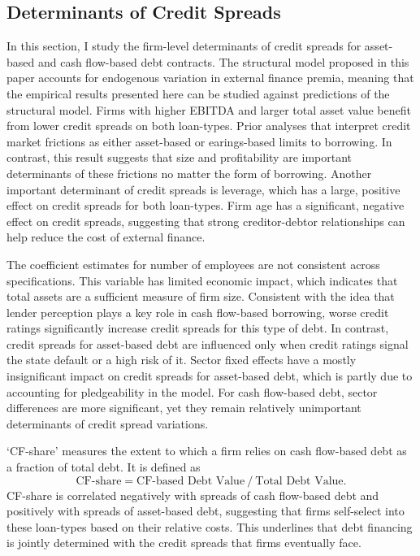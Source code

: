 \documentclass[12pt]{article}
\begin{document}
\subsection{Determinants of Credit Spreads \label{sec:credit spreads}} 
In this section, I study the firm-level determinants of credit spreads for asset-based and cash flow-based debt contracts. The structural model proposed in this paper accounts for endogenous variation in external finance premia, meaning that the empirical results presented here can be studied against predictions of the structural model. Firms with higher EBITDA and larger total asset value benefit from lower credit spreads on both loan-types. Prior analyses that interpret credit market frictions as either asset-based or earings-based limits to borrowing. In contrast, this result suggests that size and profitability are important determinants of these frictions no matter the form of borrowing. Another important determinant of credit spreads is leverage, which has a large, positive effect on credit spreads for both loan-types. Firm age has a significant, negative effect on credit spreads, suggesting that strong creditor-debtor relationships can help reduce the cost of external finance. 

The coefficient estimates for number of employees are not consistent across specifications. This variable has limited economic impact, which indicates that total assets are a sufficient measure of firm size. Consistent with the idea that lender perception plays a key role in cash flow-based borrowing, worse credit ratings significantly increase credit spreads for this type of debt. In contrast, credit spreads for asset-based debt are influenced only when credit ratings signal the state default or a high risk of it. Sector fixed effects have a mostly insignificant impact on credit spreads for asset-based debt, which is partly due to accounting for pledgeability in the model. For cash flow-based debt, sector differences are more significant, yet they remain relatively unimportant determinants of credit spread variations. 

`CF-share' measures the extent to which a firm relies on cash flow-based debt as a fraction of total debt. It is defined as 
\begin{equation*}
 \text{CF-share} = \text{CF-based Debt Value} \  / \  \text{Total Debt Value}.
\end{equation*}
CF-share is correlated negatively with spreads of cash flow-based debt and positively with spreads of asset-based debt, suggesting that firms self-select into these loan-types based on their relative costs. This underlines that debt financing is jointly determined with the credit spreads that firms eventually face. 
\end{document}
